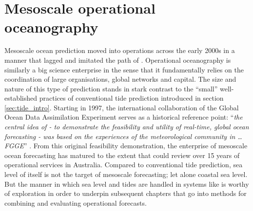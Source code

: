 \section{Mesoscale operational oceanography}
\label{sec:operational_oceanography}

Mesoscale ocean prediction moved into operations across the early 2000s in a manner that lagged and imitated the path of \NWP \citep{Harper:2008ub}. Operational oceanography is similarly a big science enterprise \citep{Petersen:2012tr} in the sense that it fundamentally relies on the coordination of large organisations, global networks and capital. 
The size and nature of this type of prediction stands in stark contrast to the ``small'' well-established practices of conventional tide prediction introduced in section \ref{sec:tide_intro}.
Starting in 1997, the international collaboration of the Global Ocean Data Assimilation Experiment \GODAE{} serves as a historical reference point:
``\textit{the central idea of \GODAE{} - to demonstrate the feasibility and utility of real-time, global ocean forecasting - was based on the experiences of the meteorological community in \dots{} FGGE}'' \citep{Bell:2009uv}.
From this original feasibility demonstration, the enterprise of mesoscale ocean forecasting has matured to the extent that \cite{10.1080/1755876x.2019.1685834} could review over 15 years of operational services in Australia.  
Compared to conventional tide prediction, sea level of itself is not the target of mesoscale forecasting; let alone coastal sea level.   But the manner in which sea level and tides are handled in systems like \BL{} is worthy of exploration in order to underpin subsequent chapters that go into methods for combining and evaluating operational forecasts. 

